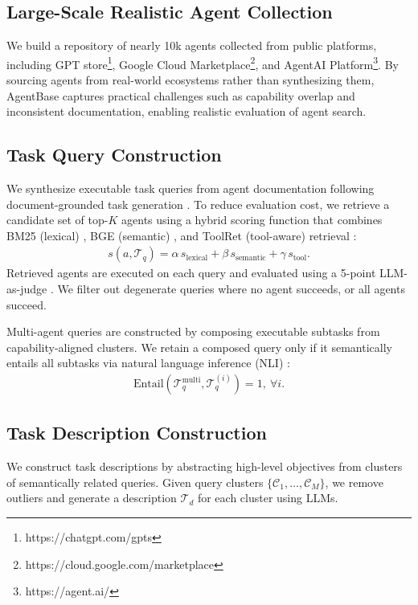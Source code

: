\documentclass{article} %
\begin{document}
\subsection{Large-Scale Realistic Agent Collection}
We build a repository of nearly 10k agents collected from public platforms, including GPT store\footnote{https://chatgpt.com/gpts}, Google Cloud Marketplace\footnote{https://cloud.google.com/marketplace}, and AgentAI Platform\footnote{https://agent.ai/}. By sourcing agents from real-world ecosystems rather than synthesizing them, AgentBase captures practical challenges such as capability overlap and inconsistent documentation, enabling realistic evaluation of agent search.

\subsection{Task Query Construction}

We synthesize executable task queries from agent documentation following document-grounded task generation \citep{DBLP:conf/iclr/QinLYZYLLCTQZHT24}. To reduce evaluation cost, we retrieve a candidate set of top-$K$ agents using a hybrid scoring function that combines BM25 (lexical) \citep{robertson2009probabilistic}, BGE (semantic) \citep{xiao2024cpack}, and ToolRet (tool-aware) retrieval \citep{shi2025retrieval}:
\begin{align}
s(a,\mathcal{T}_q)=\alpha\,s_{\text{lexical}}+\beta\,s_{\text{semantic}}+\gamma\,s_{\text{tool}}.
\end{align}
Retrieved agents are executed on each query and evaluated using a 5-point LLM-as-judge \citep{gu2024survey}. We filter out degenerate queries where no agent succeeds, or all agents succeed.

Multi-agent queries are constructed by composing executable subtasks from capability-aligned clusters. We retain a composed query only if it semantically entails all subtasks via natural language inference (NLI) \citep{wu2025natural}:
\begin{align}
\mathrm{Entail}(\mathcal{T}_q^{\text{multi}},\mathcal{T}_q^{(i)})=1,\ \forall i.
\end{align}

\subsection{Task Description Construction}

We construct task descriptions by abstracting high-level objectives from clusters of semantically related queries. Given query clusters $\{\mathcal{C}_1,\dots,\mathcal{C}_M\}$, we remove outliers and generate a description $\mathcal{T}_d$ for each cluster using LLMs.
\end{document}
